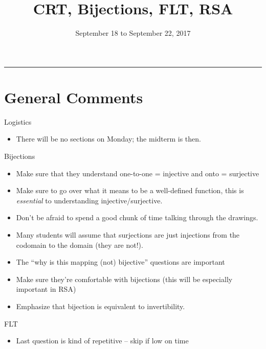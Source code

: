 \documentclass{exam}
\title{CRT, Bijections, FLT, RSA}
\date{September 18 to September 22, 2017}
\begin{document}
\maketitle
\rule{\textwidth}{0.15em}
\fontsize{12}{15}\selectfont
\thispagestyle{empty}


\section{General Comments}
\begin{questions}
\item Logistics
\begin{itemize}
\item There will be no sections on Monday; the midterm is then. 
\end{itemize}
\item Bijections
\begin{itemize}
\item Make sure that they understand one-to-one = injective and onto = surjective
\item Make sure to go over what it means to be a well-defined function, this is \textit{essential} to understanding injective/surjective.
\item Don't be afraid to spend a good chunk of time talking through the drawings.
\item Many students will assume that surjections are just injections from the codomain to the domain (they are not!).
\item The “why is this mapping (not) bijective” questions are important
\item Make sure they’re comfortable with bijections (this will be especially important in RSA)
\item Emphasize that bijection is equivalent to invertibility.
\end{itemize}
\item FLT
\begin{itemize}
\item Last question is kind of repetitive – skip if low on time
\end{itemize}


\end{questions}
\end{document}
